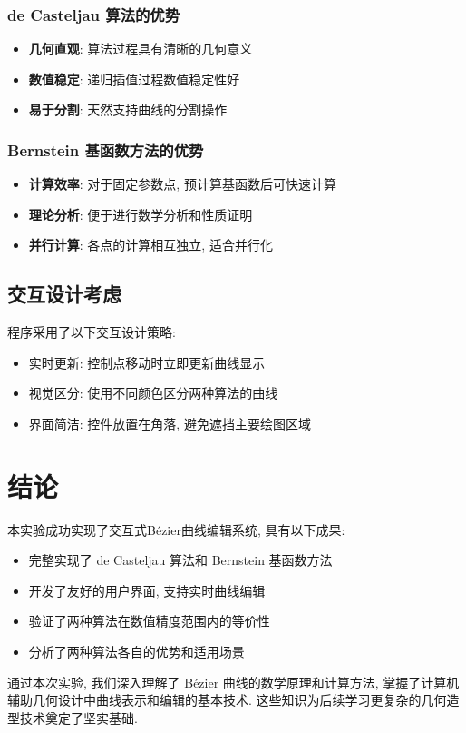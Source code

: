 \documentclass[12pt,a4paper]{report}
\begin{document}
            \subsection{de Casteljau 算法的优势}
            \begin{itemize}
                \item \textbf{几何直观}: 算法过程具有清晰的几何意义
                \item \textbf{数值稳定}: 递归插值过程数值稳定性好
                \item \textbf{易于分割}: 天然支持曲线的分割操作
            \end{itemize}

            \subsection{Bernstein 基函数方法的优势}
            \begin{itemize}
                \item \textbf{计算效率}: 对于固定参数点, 预计算基函数后可快速计算
                \item \textbf{理论分析}: 便于进行数学分析和性质证明
                \item \textbf{并行计算}: 各点的计算相互独立, 适合并行化
            \end{itemize}

        \section{交互设计考虑}
            程序采用了以下交互设计策略:
            \begin{itemize}
                \item 实时更新: 控制点移动时立即更新曲线显示
                \item 视觉区分: 使用不同颜色区分两种算法的曲线
                \item 界面简洁: 控件放置在角落, 避免遮挡主要绘图区域
            \end{itemize}

    \chapter{结论}
        本实验成功实现了交互式Bézier曲线编辑系统, 具有以下成果:

        \begin{itemize}
            \item 完整实现了 de Casteljau 算法和 Bernstein 基函数方法
            \item 开发了友好的用户界面, 支持实时曲线编辑
            \item 验证了两种算法在数值精度范围内的等价性
            \item 分析了两种算法各自的优势和适用场景
        \end{itemize}

        通过本次实验, 我们深入理解了 Bézier 曲线的数学原理和计算方法, 掌握了计算机辅助几何设计中曲线表示和编辑的基本技术. 这些知识为后续学习更复杂的几何造型技术奠定了坚实基础.
\end{document}
